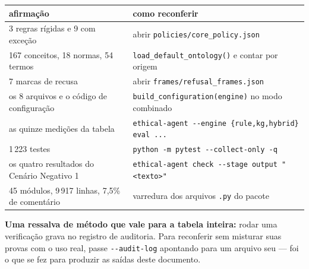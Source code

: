 \documentclass[10pt]{article}
\begin{document}
{\footnotesize
\begin{tabular}{p{}p{}}
\toprule
\textbf{afirmação} & \textbf{como reconferir} \\
\midrule
3 regras rígidas e 9 com exceção & abrir \texttt{policies/core\_policy.json} \\
167 conceitos, 18 normas, 54 termos & \texttt{load\_default\_ontology()} e contar por origem \\
7 marcas de recusa & abrir \texttt{frames/refusal\_frames.json} \\
os 8 arquivos e o código de configuração & \texttt{build\_configuration(engine)} no modo combinado \\
as quinze medições da tabela & \texttt{ethical-agent -{}-engine \{rule,kg,hybrid\} eval ...} \\
1\,223 testes & \texttt{python -m pytest -{}-collect-only -q} \\
os quatro resultados do Cenário Negativo 1 & \texttt{ethical-agent check -{}-stage output "<texto>"} \\
45 módulos, 9\,917 linhas, 7,5\% de comentário & varredura dos arquivos \texttt{.py} do pacote \\
\bottomrule
\end{tabular}}

\medskip
\textbf{Uma ressalva de método que vale para a tabela inteira:} rodar uma verificação grava no registro de auditoria. Para reconferir sem misturar suas provas com o uso real, passe \texttt{-{}-audit-log} apontando para um arquivo seu --- foi o que se fez para produzir as saídas deste documento.
\end{document}
